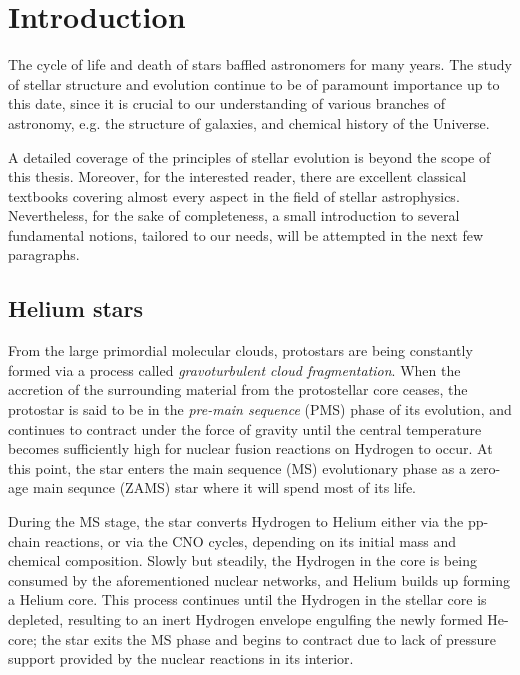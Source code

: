\documentclass[../../main/thesis_msc.tex]{subfiles}
\begin{document}
    \chapter{Introduction}
    
		The cycle of life and death of stars  baffled astronomers for many years. The study of stellar structure and evolution continue to be of paramount importance up to this date, since it is crucial to our understanding of various branches of astronomy, e.g. the structure of galaxies, and chemical history of the Universe.
		
		A detailed coverage of the principles of stellar evolution is beyond the scope of this thesis. Moreover, for the interested reader, there are excellent classical textbooks \citep{Kipp_book, Clayton} covering almost every aspect in the field of stellar astrophysics. Nevertheless, for the sake of completeness, a small introduction to several fundamental notions, tailored to our needs, will be attempted in the next few paragraphs. 
		
    
    
    \section{Helium stars}
    	
    	From the large primordial molecular clouds, protostars are being constantly formed via a process called \emph{gravoturbulent cloud fragmentation}. When the accretion of the surrounding material from the protostellar core ceases, the protostar is said to be in the \emph{pre-main sequence} (PMS) phase of its evolution, and continues to contract under the force of gravity until the central temperature becomes sufficiently high for nuclear fusion reactions on Hydrogen to occur. At this point, the star enters the main sequence (MS) evolutionary phase as a zero-age main sequnce (ZAMS) star where it will spend most of its life.
    	
    	During the MS stage, the star converts Hydrogen to Helium either via the pp-chain reactions, or via the CNO cycles, depending on its initial mass and chemical composition. Slowly but steadily, the Hydrogen in the core is being consumed by the aforementioned nuclear networks, and Helium builds up forming a Helium core. This process continues until the Hydrogen in the stellar core is depleted, resulting to an inert Hydrogen envelope engulfing the newly formed He-core; the star exits the MS phase and begins to contract due to lack of pressure support provided by the nuclear reactions in its interior.
    	
\end{document}

